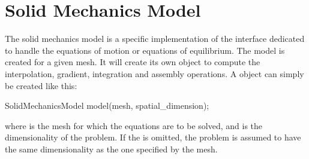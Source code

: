 \chapter{Solid Mechanics Model\label{sect:smm}}

The  solid mechanics  model is  a  specific implementation  of the  
interface  dedicated  to  handle  the   equations  of  motion  or  equations  of
equilibrium. The  model is  created for a  given mesh.   It will create  its own
  object  to  compute  the interpolation,  gradient,  integration  and
assembly operations.  A   object can simply be created
like this:
\begin{cpp}
  SolidMechanicsModel model(mesh, spatial_dimension);
\end{cpp}
where   is the  mesh for which  the equations  are to be  solved, and
  is  the  dimensionality   of  the  problem.   If  the
 is  omitted, the  problem is assumed  to have  the same
dimensionality as the one specified by the mesh.

